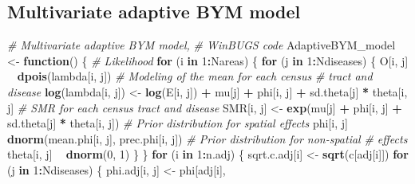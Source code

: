 \documentclass[]{article}
\newenvironment{Shaded}{\begin{snugshade}}{\end{snugshade}}
\newcommand{\KeywordTok}[1]{\textcolor[rgb]{0.13,0.29,0.53}{\textbf{#1}}}
\newcommand{\DecValTok}[1]{\textcolor[rgb]{0.00,0.00,0.81}{#1}}
\newcommand{\StringTok}[1]{\textcolor[rgb]{0.31,0.60,0.02}{#1}}
\newcommand{\CommentTok}[1]{\textcolor[rgb]{0.56,0.35,0.01}{\textit{#1}}}
\newcommand{\ControlFlowTok}[1]{\textcolor[rgb]{0.13,0.29,0.53}{\textbf{#1}}}
\newcommand{\OperatorTok}[1]{\textcolor[rgb]{0.81,0.36,0.00}{\textbf{#1}}}
\newcommand{\NormalTok}[1]{#1}
\begin{document}
\subsection{Multivariate adaptive BYM
model}\label{multivariate-adaptive-bym-model}

\begin{Shaded}
\begin{Highlighting}[]
\CommentTok{# Multivariate adaptive BYM model,}
\CommentTok{# WinBUGS code}
\NormalTok{AdaptiveBYM_model <-}\StringTok{ }\ControlFlowTok{function}\NormalTok{() \{}
    \CommentTok{# Likelihood}
    \ControlFlowTok{for}\NormalTok{ (i }\ControlFlowTok{in} \DecValTok{1}\OperatorTok{:}\NormalTok{Nareas) \{}
        \ControlFlowTok{for}\NormalTok{ (j }\ControlFlowTok{in} \DecValTok{1}\OperatorTok{:}\NormalTok{Ndiseases) \{}
\NormalTok{            O[i, j] }\OperatorTok{~}\StringTok{ }\KeywordTok{dpois}\NormalTok{(lambda[i, j])}
            \CommentTok{# Modeling of the mean for each census}
            \CommentTok{# tract and disease}
            \KeywordTok{log}\NormalTok{(lambda[i, j]) <-}\StringTok{ }\KeywordTok{log}\NormalTok{(E[i, }
\NormalTok{                j]) }\OperatorTok{+}\StringTok{ }\NormalTok{mu[j] }\OperatorTok{+}\StringTok{ }\NormalTok{phi[i, j] }\OperatorTok{+}\StringTok{ }
\StringTok{                }\NormalTok{sd.theta[j] }\OperatorTok{*}\StringTok{ }\NormalTok{theta[i, j]}
            \CommentTok{# SMR for each census tract and disease}
\NormalTok{            SMR[i, j] <-}\StringTok{ }\KeywordTok{exp}\NormalTok{(mu[j] }\OperatorTok{+}\StringTok{ }\NormalTok{phi[i, }
\NormalTok{                j] }\OperatorTok{+}\StringTok{ }\NormalTok{sd.theta[j] }\OperatorTok{*}\StringTok{ }\NormalTok{theta[i, }
\NormalTok{                j])}
            \CommentTok{# Prior distribution for spatial effects}
\NormalTok{            phi[i, j] }\OperatorTok{~}\StringTok{ }\KeywordTok{dnorm}\NormalTok{(mean.phi[i, }
\NormalTok{                j], prec.phi[i, j])}
            \CommentTok{# Prior distribution for non-spatial}
            \CommentTok{# effects}
\NormalTok{            theta[i, j] }\OperatorTok{~}\StringTok{ }\KeywordTok{dnorm}\NormalTok{(}\DecValTok{0}\NormalTok{, }\DecValTok{1}\NormalTok{)}
\NormalTok{        \}}
\NormalTok{    \}}
    \ControlFlowTok{for}\NormalTok{ (i }\ControlFlowTok{in} \DecValTok{1}\OperatorTok{:}\NormalTok{n.adj) \{}
\NormalTok{        sqrt.c.adj[i] <-}\StringTok{ }\KeywordTok{sqrt}\NormalTok{(c[adj[i]])}
        \ControlFlowTok{for}\NormalTok{ (j }\ControlFlowTok{in} \DecValTok{1}\OperatorTok{:}\NormalTok{Ndiseases) \{}
\NormalTok{            phi.adj[i, j] <-}\StringTok{ }\NormalTok{phi[adj[i], }

\end{Highlighting}
\end{Shaded}
\end{document}
